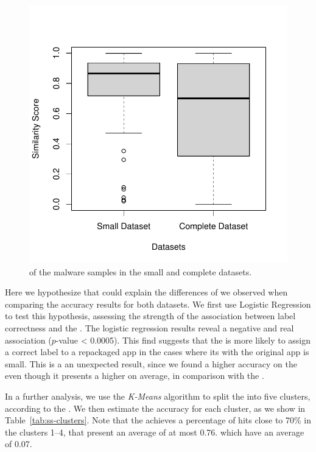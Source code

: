 \begin{figure}
  \includegraphics[width=\columnwidth]{images/similarity-1.pdf}
  \caption{\sscore of the malware samples in the small and complete datasets.}
  \label{fig:ss}
\end{figure}

Here we hypothesize that \sscore could explain
the differences of \mas we observed
when comparing the accuracy results for both
datasets. We first use Logistic Regression to test this hypothesis,
assessing the strength of the association between label correctness and
the \sscore. The logistic regression results reveal
a negative and real association ($p$-value < 0.0005). This find suggests
that the \mas is more likely to assign a correct label to
a repackaged app in the cases where its \sscore with the original
app is small. This is a an unexpected result, since
we found a higher accuracy on the \sds even though
it presents a higher \sscore on average, in comparison with the \cds. 

In a further analysis, we use the \emph{K-Means} algorithm to split the
\cds into five clusters, according to the \sscore. We then
estimate the accuracy for each cluster, as
we show in Table~\ref{tab:ss-clusters}. Note that the \mas
achieves a percentage of hits close to 70\% in the clusters
1--4, that present an average \sscore of at most 0.76.
which have an average \sscore of 0.07. 

